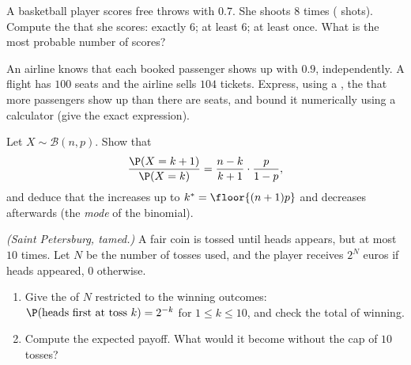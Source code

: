 \begin{exercise}[$\star\star$]\label{exo:g12:randvar:5}
A basketball player scores free throws with  $0.7$. She shoots
$8$ times ( shots). Compute the  that she scores:
exactly $6$; at least $6$; at least once. What is the most probable number
of scores?
\end{exercise}

\begin{exercise}[$\star\star$]\label{exo:g12:randvar:6}
An airline knows that each booked passenger shows up with 
$0.9$, independently. A flight has $100$ seats and the airline sells $104$
tickets. Express, using a , the  that more
passengers show up than there are seats, and bound it numerically using a
calculator (give the exact expression).
\end{exercise}

\begin{exercise}[$\star\star$]\label{exo:g12:randvar:7}
Let $X \sim \mathcal B(n, p)$. Show that
\[
\frac{\P(X = k+1)}{\P(X = k)} = \frac{n-k}{k+1}\cdot\frac{p}{1-p},
\]
and deduce that the  increases up to
$k^* = \floor{(n+1)p}$ and decreases afterwards (the \emph{mode} of the
binomial).
\end{exercise}

\begin{exercise}[$\star\star\star$]\label{exo:g12:randvar:8}
\emph{(Saint Petersburg, tamed.)} A fair coin is tossed until heads
appears, but at most $10$ times. Let $N$ be the number of tosses used, and
the player receives $2^N$ euros if heads appeared, $0$ otherwise.
\begin{enumerate}
  \item Give the  of $N$ restricted to the winning outcomes:
        $\P(\text{heads first at toss } k) = 2^{-k}$ for
        $1 \leq k \leq 10$, and check the total  of winning.
  \item Compute the expected payoff. What would it become without the cap
        of $10$ tosses?
\end{enumerate}
\end{exercise}
